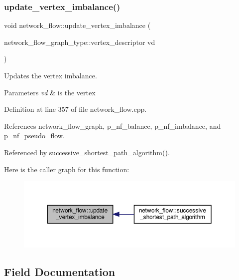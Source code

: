 \subsubsection{\texorpdfstring{update\+\_\+vertex\+\_\+imbalance()}{update\_vertex\_imbalance()}}
{\footnotesize\ttfamily void network\+\_\+flow\+::update\+\_\+vertex\+\_\+imbalance (\begin{DoxyParamCaption}\item[{network\+\_\+flow\+\_\+graph\+\_\+type\+::vertex\+\_\+descriptor}]{vd }\end{DoxyParamCaption})\hspace{0.3cm}{\ttfamily [private]}}



Updates the vertex imbalance. 


\begin{DoxyParams}{Parameters}
{\em vd} & is the vertex \\
\hline
\end{DoxyParams}


Definition at line 357 of file network\+\_\+flow.\+cpp.



References network\+\_\+flow\+\_\+graph, p\+\_\+nf\+\_\+balance, p\+\_\+nf\+\_\+imbalance, and p\+\_\+nf\+\_\+pseudo\+\_\+flow.



Referenced by successive\+\_\+shortest\+\_\+path\+\_\+algorithm().

Here is the caller graph for this function\+:
\nopagebreak
\begin{figure}[H]
\begin{center}
\leavevmode
\includegraphics[width=350pt]{d2/d4f/classnetwork__flow_a7ed1ac1a83151c5af0026a72b84405bb_icgraph}
\end{center}
\end{figure}


\subsection{Field Documentation}
\mbox{\label{classnetwork__flow_ac31f2a0cbbafcf5ac5f0d415952f8817}} 
